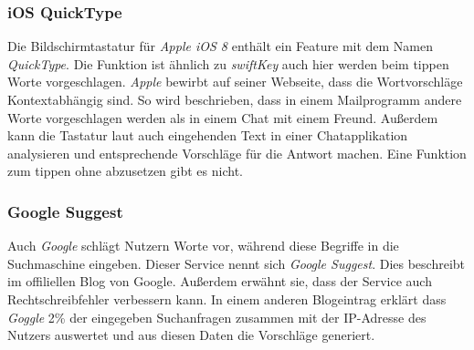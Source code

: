         \subsubsection*{iOS QuickType}
        
        	Die Bildschirmtastatur für \emph{Apple iOS 8} enthält ein Feature mit dem Namen \emph{QuickType}. Die Funktion ist ähnlich zu \emph{swiftKey} auch hier werden beim tippen Worte vorgeschlagen. \emph{Apple} bewirbt auf seiner Webseite, dass die Wortvorschläge Kontextabhängig sind. So wird beschrieben, dass in einem Mailprogramm andere Worte vorgeschlagen werden als in einem Chat mit einem Freund. Außerdem kann die Tastatur laut \cite{apple:quickType} auch eingehenden Text in einer Chatapplikation analysieren und entsprechende Vorschläge für die Antwort machen. Eine Funktion zum tippen ohne abzusetzen gibt es nicht.
        
        \subsubsection*{Google Suggest}
        
        	Auch \emph{Google} schlägt Nutzern Worte vor, während diese Begriffe in die Suchmaschine eingeben. Dieser Service nennt sich \emph{Google Suggest}. Dies beschreibt \cite{google:suggestIntro} im offiliellen Blog von Google. Außerdem erwähnt sie, dass der Service auch Rechtschreibfehler verbessern kann. In einem anderen Blogeintrag erklärt \cite{google:suggestUpdate} dass \emph{Goggle} 2\% der eingegeben Suchanfragen zusammen mit der IP-Adresse des Nutzers auswertet und aus diesen Daten die Vorschläge generiert.
    
    
    
    \newpage